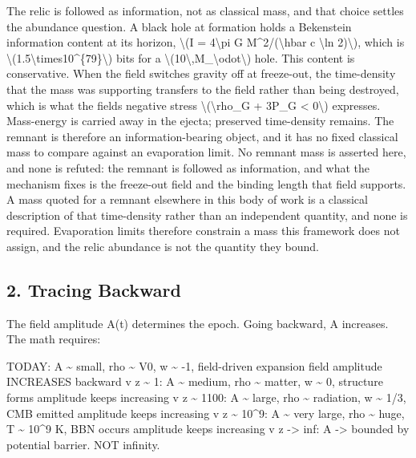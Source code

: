 \documentclass[
  10pt,
]{article}
\begin{document}
The relic is followed as information, not as classical mass, and that
choice settles the abundance question. A black hole at formation holds a
Bekenstein information content at its horizon, \textbackslash(I =
4\textbackslash pi G M\^{}2/(\textbackslash hbar c \textbackslash ln
2)\textbackslash), which is
\textbackslash(1.5\textbackslash times10\^{}\{79\}\textbackslash) bits
for a
\textbackslash(10\textbackslash,M\_\textbackslash odot\textbackslash)
hole. This content is conservative. When the field switches gravity off
at freeze-out, the time-density that the mass was supporting transfers
to the field rather than being destroyed, which is what the
field\textquotesingle s negative stress
\textbackslash(\textbackslash rho\_G + 3P\_G \textless{}
0\textbackslash) expresses. Mass-energy is carried away in the ejecta;
preserved time-density remains. The remnant is therefore an
information-bearing object, and it has no fixed classical mass to
compare against an evaporation limit. No remnant mass is asserted here,
and none is refuted: the remnant is followed as information, and what
the mechanism fixes is the freeze-out field and the binding length that
field supports. A mass quoted for a remnant elsewhere in this body of
work is a classical description of that time-density rather than an
independent quantity, and none is required. Evaporation limits therefore
constrain a mass this framework does not assign, and the relic abundance
is not the quantity they bound.

\hypertarget{tracing-backward}{%
\subsection{2. Tracing Backward}\label{tracing-backward}}

The field amplitude A(t) determines the epoch. Going backward, A
increases. The math requires:

TODAY: A \textasciitilde{} small, rho \textasciitilde{} V0, w
\textasciitilde{} -1, field-driven expansion \textbar{} field amplitude
INCREASES backward v z \textasciitilde{} 1: A \textasciitilde{} medium,
rho \textasciitilde{} matter, w \textasciitilde{} 0, structure forms
\textbar{} amplitude keeps increasing v z \textasciitilde{} 1100: A
\textasciitilde{} large, rho \textasciitilde{} radiation, w
\textasciitilde{} 1/3, CMB emitted \textbar{} amplitude keeps increasing
v z \textasciitilde{} 10\^{}9: A \textasciitilde{} very large, rho
\textasciitilde{} huge, T \textasciitilde{} 10\^{}9 K, BBN occurs
\textbar{} amplitude keeps increasing v z -\textgreater{} inf: A
-\textgreater{} bounded by potential barrier. NOT infinity.
\end{document}
